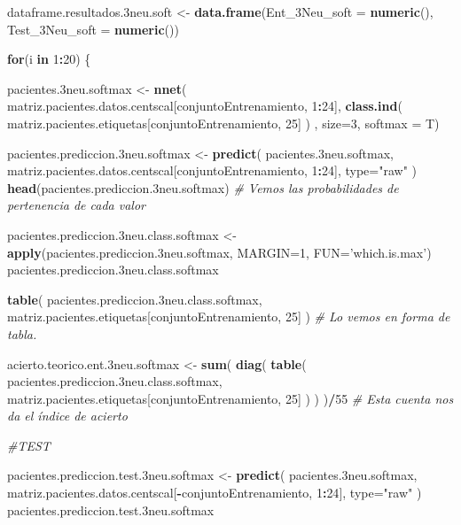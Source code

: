 \documentclass[]{article}
\newenvironment{Shaded}{\begin{snugshade}}{\end{snugshade}}
\newcommand{\KeywordTok}[1]{\textcolor[rgb]{0.13,0.29,0.53}{\textbf{#1}}}
\newcommand{\DataTypeTok}[1]{\textcolor[rgb]{0.13,0.29,0.53}{#1}}
\newcommand{\DecValTok}[1]{\textcolor[rgb]{0.00,0.00,0.81}{#1}}
\newcommand{\StringTok}[1]{\textcolor[rgb]{0.31,0.60,0.02}{#1}}
\newcommand{\CommentTok}[1]{\textcolor[rgb]{0.56,0.35,0.01}{\textit{#1}}}
\newcommand{\ControlFlowTok}[1]{\textcolor[rgb]{0.13,0.29,0.53}{\textbf{#1}}}
\newcommand{\OperatorTok}[1]{\textcolor[rgb]{0.81,0.36,0.00}{\textbf{#1}}}
\newcommand{\NormalTok}[1]{#1}
\begin{document}
\begin{Shaded}
\begin{Highlighting}[]
\NormalTok{dataframe.resultados.3neu.soft <-}\StringTok{ }\KeywordTok{data.frame}\NormalTok{(}\DataTypeTok{Ent_3Neu_soft =} \KeywordTok{numeric}\NormalTok{(),}
                                             \DataTypeTok{Test_3Neu_soft =} \KeywordTok{numeric}\NormalTok{())}

\ControlFlowTok{for}\NormalTok{(i }\ControlFlowTok{in} \DecValTok{1}\OperatorTok{:}\DecValTok{20}\NormalTok{)}
\NormalTok{\{}

\NormalTok{  pacientes.3neu.softmax <-}\StringTok{ }\KeywordTok{nnet}\NormalTok{( matriz.pacientes.datos.centscal[conjuntoEntrenamiento, }\DecValTok{1}\OperatorTok{:}\DecValTok{24}\NormalTok{], }\KeywordTok{class.ind}\NormalTok{( matriz.pacientes.etiquetas[conjuntoEntrenamiento, }\DecValTok{25}\NormalTok{] ) , }\DataTypeTok{size=}\DecValTok{3}\NormalTok{, }\DataTypeTok{softmax =}\NormalTok{ T)}
  
\NormalTok{  pacientes.prediccion.3neu.softmax <-}\StringTok{ }\KeywordTok{predict}\NormalTok{( pacientes.3neu.softmax, matriz.pacientes.datos.centscal[conjuntoEntrenamiento, }\DecValTok{1}\OperatorTok{:}\DecValTok{24}\NormalTok{], }\DataTypeTok{type=}\StringTok{"raw"}\NormalTok{ )}
  \KeywordTok{head}\NormalTok{(pacientes.prediccion.3neu.softmax) }\CommentTok{# Vemos las probabilidades de pertenencia de cada valor}
  
  
\NormalTok{  pacientes.prediccion.3neu.class.softmax <-}\StringTok{ }\KeywordTok{apply}\NormalTok{(pacientes.prediccion.3neu.softmax, }\DataTypeTok{MARGIN=}\DecValTok{1}\NormalTok{, }\DataTypeTok{FUN=}\StringTok{'which.is.max'}\NormalTok{)}
\NormalTok{  pacientes.prediccion.3neu.class.softmax}
  
  
  \KeywordTok{table}\NormalTok{( pacientes.prediccion.3neu.class.softmax, matriz.pacientes.etiquetas[conjuntoEntrenamiento, }\DecValTok{25}\NormalTok{] )  }\CommentTok{# Lo vemos en forma de tabla.}
  
  
\NormalTok{  acierto.teorico.ent.3neu.softmax <-}\StringTok{ }\KeywordTok{sum}\NormalTok{( }\KeywordTok{diag}\NormalTok{( }\KeywordTok{table}\NormalTok{( pacientes.prediccion.3neu.class.softmax, matriz.pacientes.etiquetas[conjuntoEntrenamiento, }\DecValTok{25}\NormalTok{] ) ) )}\OperatorTok{/}\DecValTok{55} \CommentTok{# Esta cuenta nos da el índice de acierto}
  
  \CommentTok{#TEST}
  
\NormalTok{  pacientes.prediccion.test.3neu.softmax <-}\StringTok{ }\KeywordTok{predict}\NormalTok{( pacientes.3neu.softmax, matriz.pacientes.datos.centscal[}\OperatorTok{-}\NormalTok{conjuntoEntrenamiento, }\DecValTok{1}\OperatorTok{:}\DecValTok{24}\NormalTok{], }\DataTypeTok{type=}\StringTok{"raw"}\NormalTok{ )}
\NormalTok{  pacientes.prediccion.test.3neu.softmax}
  

\end{Highlighting}
\end{Shaded}
\end{document}
